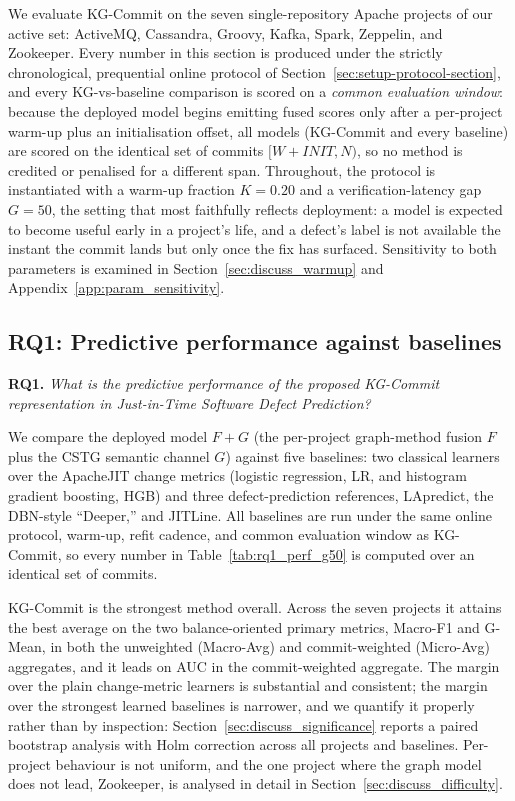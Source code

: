 \documentclass[final,5p,times,twocolumn]{elsarticle}
\theoremstyle{plain}
\begin{document}
We evaluate KG-Commit on the seven single-repository Apache projects of our active
set: ActiveMQ, Cassandra, Groovy, Kafka, Spark, Zeppelin, and Zookeeper. Every number
in this section is produced under the strictly chronological, prequential online
protocol of Section~\ref{sec:setup-protocol-section}, and every KG-vs-baseline
comparison is scored on a \emph{common evaluation window}: because the deployed model
begins emitting fused scores only after a per-project warm-up plus an
initialisation offset, all models (KG-Commit and every baseline) are scored on the
identical set of commits $[W{+}\mathit{INIT},N)$, so no method is credited or
penalised for a different span. Throughout, the protocol is instantiated with a
warm-up fraction $K{=}0.20$ and a verification-latency gap $G{=}50$, the setting that
most faithfully reflects deployment: a model is expected to become useful early in a
project's life, and a defect's label is not available the instant the commit lands but
only once the fix has surfaced. Sensitivity to both parameters is examined in
Section~\ref{sec:discuss_warmup} and Appendix~\ref{app:param_sensitivity}.

\subsection{RQ1: Predictive performance against baselines}
\label{sec:rq1_narrative}
\textbf{RQ1.} \emph{What is the predictive performance of the proposed KG-Commit
representation in Just-in-Time Software Defect Prediction?}

We compare the deployed model $F{+}G$ (the per-project graph-method fusion $F$ plus the
CSTG semantic channel $G$) against five baselines: two classical learners over the
ApacheJIT change metrics (logistic regression, LR, and histogram gradient boosting,
HGB) and three defect-prediction references, LApredict, the DBN-style
``Deeper,'' and JITLine. All baselines are run under the same online protocol, warm-up,
refit cadence, and common evaluation window as KG-Commit, so every number in
Table~\ref{tab:rq1_perf_g50} is computed over an identical set of commits.

KG-Commit is the strongest method overall. Across the seven projects it
attains the best average on the two balance-oriented primary metrics, Macro-F1 and
G-Mean, in both the unweighted (Macro-Avg) and commit-weighted (Micro-Avg) aggregates,
and it leads on AUC in the commit-weighted aggregate. The margin over the plain
change-metric learners is substantial and consistent; the margin over the strongest
learned baselines is narrower, and we quantify it properly rather than by inspection:
Section~\ref{sec:discuss_significance} reports a paired bootstrap analysis with
Holm correction across all projects and baselines. Per-project behaviour is not
uniform, and the one project where the graph model does not lead, Zookeeper, is
analysed in detail in Section~\ref{sec:discuss_difficulty}.
\end{document}
